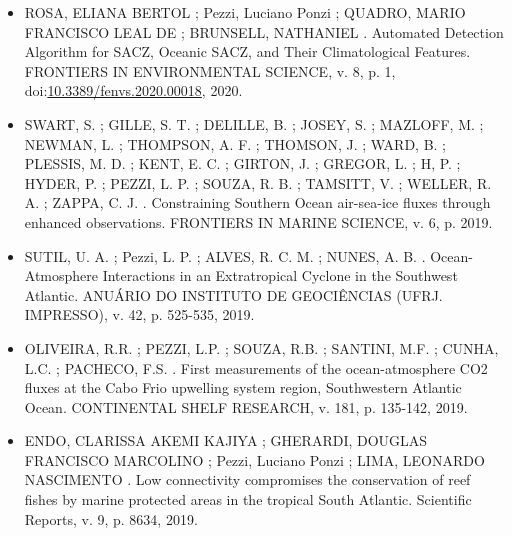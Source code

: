 \documentclass[11pt, a4paper]{awesome-cv}
\begin{document}
\makecvheader[R]

\makelettertitle

\begin{cvletter}
\vspace{-2cm}
\begin{itemize}
  \item[] ROSA, ELIANA BERTOL ; Pezzi, Luciano Ponzi ; QUADRO, MARIO FRANCISCO LEAL DE ; BRUNSELL, 
  NATHANIEL . Automated Detection Algorithm for SACZ, Oceanic SACZ, and Their Climatological Features. 
  FRONTIERS IN ENVIRONMENTAL SCIENCE, v. 8, p. 1, 
  doi:\textcolor{bleu_cite}{\href{http://dx.doi.org/10.3389/fenvs.2020.00018}{10.3389/fenvs.2020.00018}}, 2020. 

  \item[] SWART, S. ; GILLE, S. T. ; DELILLE, B. ; JOSEY, S. ; MAZLOFF, M. ; NEWMAN, L. ; THOMPSON, A. F. ; 
  THOMSON, J. ; WARD, B. ; PLESSIS, M. D. ; KENT, E. C. ; GIRTON, J. ; GREGOR, L. ; H, P. ; HYDER, P. ; 
  PEZZI, L. P. ; SOUZA, R. B. ; TAMSITT, V. ; WELLER, R. A. ; ZAPPA, C. J. . Constraining Southern 
  Ocean air-sea-ice fluxes through enhanced observations. FRONTIERS IN MARINE SCIENCE, v. 6, p. 
  2019. 

  \item[] SUTIL, U. A. ; Pezzi, L. P. ; ALVES, R. C. M. ; NUNES, A. B. . 
  Ocean-Atmosphere Interactions in an Extratropical Cyclone in the Southwest Atlantic. 
  ANUÁRIO DO INSTITUTO DE GEOCIÊNCIAS (UFRJ. IMPRESSO), v. 42, p. 525-535, 
  2019. 

  \item[] OLIVEIRA, R.R. ; PEZZI, L.P. ; SOUZA, R.B. ; SANTINI, M.F. ; CUNHA, L.C. ; PACHECO, F.S. . 
  First measurements of the ocean-atmosphere CO2 fluxes at the Cabo Frio upwelling system region, 
  Southwestern Atlantic Ocean. CONTINENTAL SHELF RESEARCH, v. 181, p. 135-142,
   2019.

  \item[] ENDO, CLARISSA AKEMI KAJIYA ; GHERARDI, DOUGLAS FRANCISCO MARCOLINO ; Pezzi, Luciano Ponzi 
  ; LIMA, LEONARDO NASCIMENTO . Low connectivity compromises the conservation of reef fishes by 
  marine protected areas in the tropical South Atlantic. Scientific Reports, v. 9, p. 8634, 
  2019.


\end{itemize}
\end{cvletter}
\end{document}
